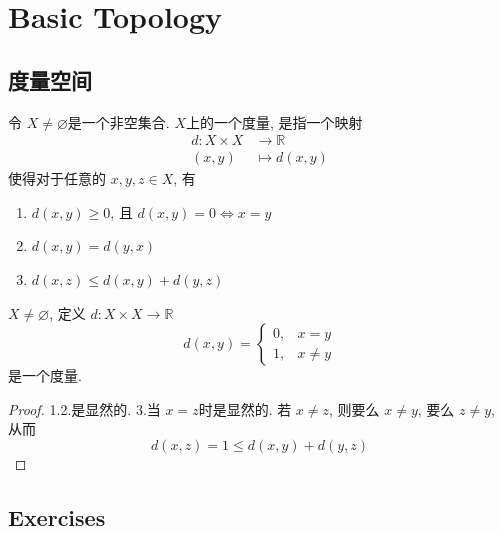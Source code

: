 \documentclass[../main.tex]{subfiles}
\begin{document}
\chapter{Basic Topology}

\section{度量空间}

\begin{definition}{}{}
    令 \(  X \neq \varnothing  \)是一个非空集合.  \(  X  \)上的一个度量, 是指一个映射 \[
    \begin{aligned}
    d: X\times X&\to \mathbb{R} \\ 
     \left( x,y\right)&\mapsto d\left( x,y \right)   
    \end{aligned}
    \]使得对于任意的 \(  x,y,z\in X  \), 有
    \begin{enumerate}
        \item \(  d\left( x,y \right)\ge 0   \), 且 \(  d\left( x,y \right)= 0   \iff  x= y\)  
        \item \(  d\left( x,y \right)= d\left( y,x \right)    \) 
        \item \(  d\left( x,z \right)\le d\left( x,y \right)+ d\left( y,z \right)     \)  
    \end{enumerate}
       
\end{definition}

\begin{example}{}{}
    \(  X\neq \varnothing  \), 定义 \(  d:X\times X\to \mathbb{R}   \) \[
    d\left( x,y \right)= \begin{cases} 0,&x= y \\ 
     1,&x\neq y\end{cases}  
    \]  是一个度量.
\end{example}
\begin{proof}
    1.2.是显然的. 3.当 \(  x= z  \)时是显然的. 若 \(  x\neq z  \), 则要么 \(  x\neq y  \), 要么 \(  z\neq y  \), 从而 \[
    d\left( x,z \right)= 1\le d\left( x,y \right)  + d\left( y,z \right) 
    \]   
\end{proof}

\section{Exercises}
\end{document}
